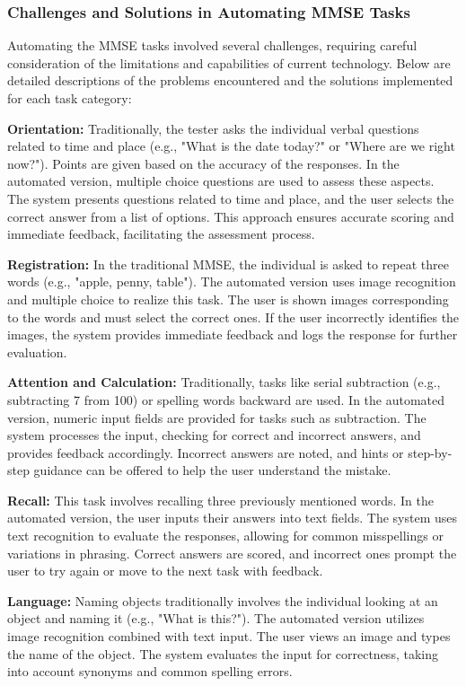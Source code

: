 \subsubsection{Challenges and Solutions in Automating MMSE Tasks}

Automating the MMSE tasks involved several challenges, requiring careful consideration of the limitations and capabilities of current technology. Below are detailed descriptions of the problems encountered and the solutions implemented for each task category:

\textbf{Orientation:} Traditionally, the tester asks the individual verbal questions related to time and place (e.g., "What is the date today?" or "Where are we right now?"). Points are given based on the accuracy of the responses. In the automated version, multiple choice questions are used to assess these aspects. The system presents questions related to time and place, and the user selects the correct answer from a list of options. This approach ensures accurate scoring and immediate feedback, facilitating the assessment process.

\textbf{Registration:} In the traditional MMSE, the individual is asked to repeat three words (e.g., "apple, penny, table"). The automated version uses image recognition and multiple choice to realize this task. The user is shown images corresponding to the words and must select the correct ones. If the user incorrectly identifies the images, the system provides immediate feedback and logs the response for further evaluation.

\textbf{Attention and Calculation:} Traditionally, tasks like serial subtraction (e.g., subtracting 7 from 100) or spelling words backward are used. In the automated version, numeric input fields are provided for tasks such as subtraction. The system processes the input, checking for correct and incorrect answers, and provides feedback accordingly. Incorrect answers are noted, and hints or step-by-step guidance can be offered to help the user understand the mistake.

\textbf{Recall:} This task involves recalling three previously mentioned words. In the automated version, the user inputs their answers into text fields. The system uses text recognition to evaluate the responses, allowing for common misspellings or variations in phrasing. Correct answers are scored, and incorrect ones prompt the user to try again or move to the next task with feedback.

\textbf{Language:} Naming objects traditionally involves the individual looking at an object and naming it (e.g., "What is this?"). The automated version utilizes image recognition combined with text input. The user views an image and types the name of the object. The system evaluates the input for correctness, taking into account synonyms and common spelling errors.

